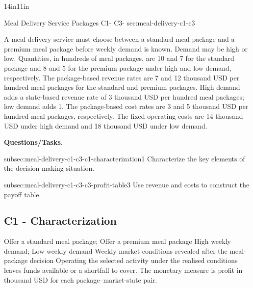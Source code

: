 {\begin{CalculationLandscape}{14in}{11in}
		
		\begingroup\renewcommand{\CalculationStateCount}{2}
\endgroup
\end{CalculationLandscape}

		
		
	}
		
	\sectionScored
	{Meal Delivery Service Packages}
	{C1- \hspace{2mm} C3-}
	{sec:meal-delivery-c1-c3}
	{
		A meal delivery service must choose between a standard meal package and a
		premium meal package before weekly demand is known. Demand may be
		high or low. Quantities, in hundreds of meal packages, are 10 and 7
		for the standard package and 8 and 5 for the premium package under high and
		low demand, respectively. The package-based revenue rates are 7 and 12
		thousand USD per hundred meal packages for the standard and premium
		packages. High demand adds a state-based revenue rate of 3 thousand USD
		per hundred meal packages; low demand adds 1. The package-based cost rates
		are 3 and 5 thousand USD per hundred meal packages, respectively. The
		fixed operating costs are 14 thousand USD under high demand and
		18 thousand USD under low demand.
		
			\textbf{Questions/Tasks.}
		\begin{enumerate}
			\CriterionTask
			{subsec:meal-delivery-c1-c3-c1-characterization}{1}
			{Characterize the key elements of the decision-making situation. }
			
			\CriterionTask
			{subsec:meal-delivery-c1-c3-c3-profit-table}{3}
			{Use revenue and costs to construct the payoff table. }
		\end{enumerate}
		
		\label{subsec:meal-delivery-c1-c3-c1-characterization}
		\subsection*{C1 - Characterization }
		
		\DecisionElementsTable
{Offer a standard meal package; Offer a premium meal package}
{High weekly demand; Low weekly demand}
{Weekly market conditions revealed after the meal-package decision}
{Operating the selected activity under the realised conditions leaves funds available or a shortfall to cover. The monetary measure is profit in thousand USD for each package--market-state pair.}

}
